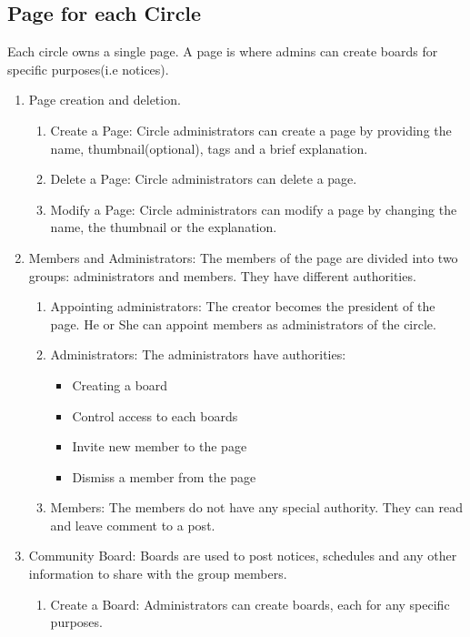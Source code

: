 \documentclass[conference]{IEEEtran}
\begin{document}
\subsection{Page for each Circle}
Each circle owns a single page. A page is where admins can create boards for specific purposes(i.e notices).
\begin{enumerate}
    \item Page creation and deletion.
    \begin{enumerate}
        \item Create a Page: Circle administrators can create a page by providing the name, thumbnail(optional), tags and a brief explanation.
        \item Delete a Page: Circle administrators can delete a page.
        \item Modify a Page: Circle administrators can modify a page by changing the name, the thumbnail or the explanation.
    \end{enumerate}
    \item Members and Administrators: The members of the page are divided into two groups: administrators and members. They have different authorities.
        \begin{enumerate}
            \item Appointing administrators: The creator becomes the president of the page. He or She can appoint members as administrators of the circle.
            \item Administrators: The administrators have authorities:
            \begin{itemize}
                \item Creating a board
                \item Control access to each boards
                \item Invite new member to the page
                \item Dismiss a member from the page
            \end{itemize}
            \item Members: The members do not have any special authority. They can read and leave comment to a post.
        \end{enumerate}
    \item Community Board: Boards are used to post notices, schedules and any other information to share with the group members.
        \begin{enumerate}
            \item Create a Board: Administrators can create boards, each for any specific purposes.

\end{enumerate}
\end{enumerate}
\end{document}
